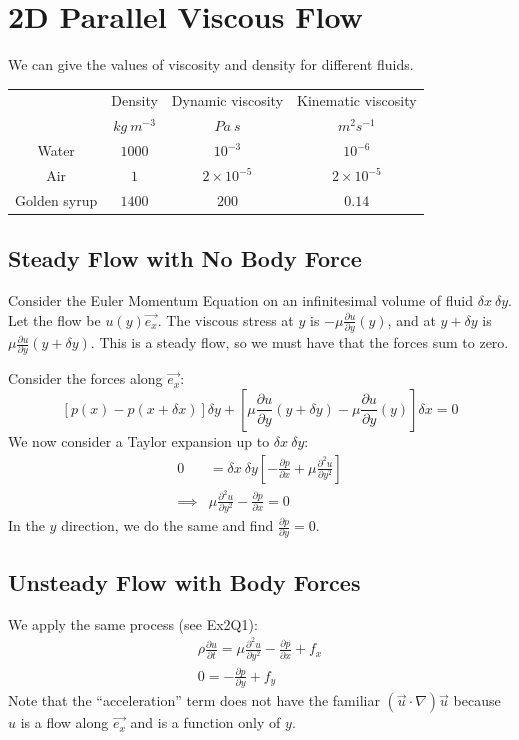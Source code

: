 \documentclass[../Main.tex]{subfiles}
\begin{document}
\section{2D Parallel Viscous Flow}
We can give the values of viscosity and density for different fluids.

\begin{tabular}{|c|c|c|c|}
    \hline
     & Density & Dynamic viscosity & Kinematic viscosity \\
     & $kg~m^{-3}$ & $Pa~s$ & $m^2 s^{-1}$ \\
    \hline
    Water & $1000$ & $10^{-3}$ & $10^{-6}$ \\
    Air & $1$ & $2\times10^{-5}$ & $2 \times 10^{-5}$ \\
    Golden syrup & $1400$ & $200$ & $0.14$ \\
    \hline
\end{tabular}
\subsection{Steady Flow with No Body Force}
Consider the Euler Momentum Equation on an infinitesimal volume of fluid $\delta x~\delta y$. Let the flow be $u(y) \vec{e_x}$. The viscous stress at $y$ is $-\mu \frac{\partial u}{\partial y}(y)$, and at $y + \delta y$ is $\mu \frac{\partial u}{\partial y} (y + \delta y)$.
This is a steady flow, so we must have that the forces sum to zero.

Consider the forces along $\vec{e_x}$:
\begin{equation*}
    \left[p(x) - p(x + \delta x)\right] \delta y + \left[\mu \frac{\partial u}{\partial y} (y + \delta y) - \mu \frac{\partial u}{\partial y}(y)\right]\delta x = 0
\end{equation*}
We now consider a Taylor expansion up to $\delta x~\delta y$:
\begin{align*}
    0 &= \delta x~\delta y \left[-\frac{\partial p}{\partial x} + \mu \frac{\partial^{2}u}{\partial y^{2}}\right] \\
    \implies& \mu \frac{\partial^{2}u}{\partial y^{2}} - \frac{\partial p}{\partial x} = 0
\end{align*}
In the $y$ direction, we do the same and find $\frac{\partial p}{\partial y} = 0$.
\subsection{Unsteady Flow with Body Forces}
We apply the same process (see Ex2Q1):
\begin{equation}
    \begin{split}
    \rho \frac{\partial u}{\partial t} = \mu \frac{\partial^{2}u}{\partial y^{2}} - \frac{\partial p}{\partial x} + f_x \\
    0 = -\frac{\partial p}{\partial y} + f_y
    \end{split}
    \label{eqnViscousFlowForces}
\end{equation}
Note that the ``acceleration'' term does not have the familiar $(\vec{u} \cdot \nabla)\vec{u}$ because $u$ is a flow along $\vec{e_x}$ and is a function only of $y$.
\end{document}
